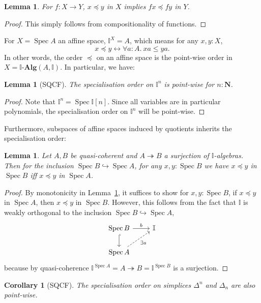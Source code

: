 \documentclass[12pt]{amsart}
\newtheorem{lemma}[theorem]{Lemma}
\newtheorem{corollary}[theorem]{Corollary}
\theoremstyle{definition}
\newcommand{\mb}[1]{\mathbf{#1}}
\newcommand{\mbb}[1]{\mathbb{#1}}
\newcommand{\I}{\mbb I}
\newcommand{\alg}{\text{-}\mb{Alg}}
\newcommand{\surj}{\twoheadrightarrow}
\newcommand{\hook}{\hookrightarrow}
\newcommand{\N}{\mb N}
\newcommand{\fa}[2]{\forall #1\!\colon\!\!#2.\ }
\newcommand{\eq}{\leftrightarrow}
\newcommand{\spec}{\operatorname{Spec}}
\begin{document}
\begin{lemma}\label{lem:anymapmonotoneintriscorder}
  For $f : X \to Y$, $x \preceq y$ in $X$ implies $fx \preceq fy$ in $Y$.
\end{lemma}
\begin{proof}
  This simply follows from compositionality of functions.
\end{proof}

For $X = \spec A$ an affine space, $\I^X = A$, which means for any $x,y : X$,
\[ x \preceq y \eq \fa aA xa \le ya. \]
In other words, the order $\preceq$ on an affine space is the point-wise order in $X = \I\alg(A,\I)$. In particular, we have:

\begin{lemma}[SQCF]
  The specialisation order on $\I^n$ is point-wise for $n : \N$.
\end{lemma}
\begin{proof}
  Note that $\I^n = \spec \I[n]$. Since all variables are in particular polynomials, the specialisation order on $\I^n$ will be point-wise.
\end{proof}

Furthermore, subspaces of affine spaces induced by quotients inherits the specialisation order:

\begin{lemma}\label{lem:orderonaffine}
  Let $A,B$ be quasi-coherent and $A \surj B$ a surjection of $\I$-algebras. Then for the inclusion $\spec B \hook \spec A$, for any $x,y : \spec B$ we have $x \preceq y$ in $\spec B$ iff $x \preceq y$ in $\spec A$.
\end{lemma}
\begin{proof}
  By monotonicity in Lemma~\ref{lem:anymapmonotoneintriscorder}, it suffices to show for $x,y : \spec B$, if $x \preceq y$ in $\spec A$, then $x \preceq y$ in $\spec B$. However, this follows from the fact that $\I$ is weakly orthogonal to the inclusion $\spec B \hook \spec A$,
  \[
  \begin{tikzcd}
    \spec B \ar[d, hook] \ar[r, "b"] & \I \\ 
    \spec A \ar[ur, dashed, "\exists a"'] 
  \end{tikzcd}
  \]
  because by quasi-coherence $\I^{\spec A} = A \surj B = \I^{\spec B}$ is a surjection.
\end{proof}

\begin{corollary}[SQCF]\label{cor:syntheticorderinterval}
  The specialisation order on simplices $\Delta^n$ and $\Delta_n$ are also point-wise.
\end{corollary}
\end{document}
